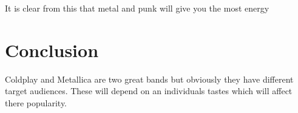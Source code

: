 \documentclass[12pt,preprint, authoryear]{elsarticle}
\numberwithin{equation}{section}
\numberwithin{figure}{section}
\numberwithin{table}{section}
\begin{document}
It is clear from this that metal and punk will give you the most energy

\hypertarget{conclusion}{%
\section{Conclusion}\label{conclusion}}

Coldplay and Metallica are two great bands but obviously they have
different target audiences. These will depend on an individuals tastes
which will affect there popularity.


\end{document}
